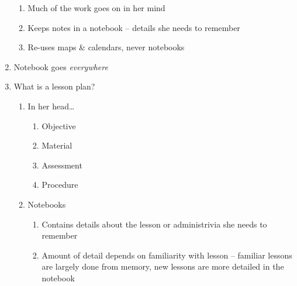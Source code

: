 \begin{enumerate}
\begin{enumerate}
			\item Much of the work goes on in her mind
			\item Keeps notes in a notebook -- details she needs to remember
			\item Re-uses maps \& calendars, never notebooks
		\end{enumerate}
	\item Notebook goes \textit{everywhere}
	\item What is a lesson plan?
		\begin{enumerate}
			\item In her head\ldots
				\begin{enumerate}
					\item Objective
					\item Material
					\item Assessment
					\item Procedure
				\end{enumerate}
			\item Notebooks
				\begin{enumerate}
					\item Contains details about the lesson or administrivia she
						needs to remember
					\item Amount of detail depends on familiarity with lesson --
						familiar lessons are largely done from memory, new
						lessons are more detailed in the notebook
				\end{enumerate}
		\end{enumerate}
\end{enumerate}

